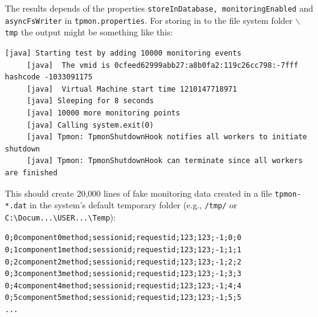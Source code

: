 \documentclass[a4paper,12pt]{scrartcl}
\begin{document}
The results depends of the properties \texttt{storeInDatabase, monitoringEnabled} and \texttt{asyncFsWriter} in \texttt{tpmon.properties}. For storing in to the file system folder \texttt{$\backslash$tmp} the output might be something like this:

\begin{lstlisting}[caption={Output example for storage test},label={lst4}]
 [java] Starting test by adding 10000 monitoring events
     [java]  The vmid is 0cfeed62999abb27:a8b0fa2:119c26cc798:-7fff hashcode -1033091175
     [java]  Virtual Machine start time 1210147718971
     [java] Sleeping for 8 seconds
     [java] 10000 more monitoring points
     [java] Calling system.exit(0)
     [java] Tpmon: TpmonShutdownHook notifies all workers to initiate shutdown
     [java] Tpmon: TpmonShutdownHook can terminate since all workers are finished
\end{lstlisting}

This should create 20,000 lines of fake monitoring data created in a file \texttt{tpmon-*.dat} in the system's default temporary folder (e.g., \texttt{/tmp/} or \verb=C:\Docum...\USER...\Temp=):
\begin{lstlisting}[caption={Example fake monitoring data produced by the storage test},label={lst5}]
0;0component0method;sessionid;requestid;123;123;-1;0;0
0;1component1method;sessionid;requestid;123;123;-1;1;1
0;2component2method;sessionid;requestid;123;123;-1;2;2
0;3component3method;sessionid;requestid;123;123;-1;3;3
0;4component4method;sessionid;requestid;123;123;-1;4;4
0;5component5method;sessionid;requestid;123;123;-1;5;5
...
\end{lstlisting}
\end{document}
